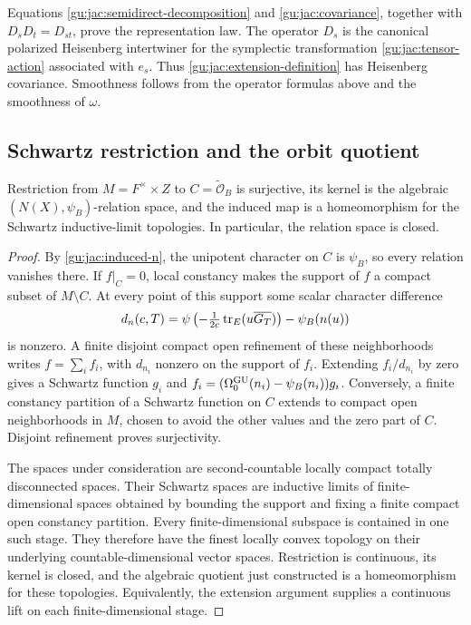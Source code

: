 Equations \eqref{gu:jac:semidirect-decomposition} and \eqref{gu:jac:covariance},
together with $D_sD_t=D_{st}$, prove the representation law.
The operator $D_s$ is the canonical polarized Heisenberg intertwiner for
the symplectic transformation \eqref{gu:jac:tensor-action} associated with
$e_s$.  Thus \eqref{gu:jac:extension-definition} has Heisenberg
covariance.  Smoothness follows from the operator formulas above and the
smoothness of $\omega$.

\subsection{Schwartz restriction and the orbit quotient}\label{gu:app:topology}
\begin{lemma}\label{gu:jac:restriction}
Restriction from $M=F^\times\times Z$ to $C=\widetilde{\mathcal O}_B$
is surjective, its kernel is the algebraic $(N(X),\psi_B)$-relation
space, and the induced map is a homeomorphism for the Schwartz
inductive-limit topologies. In particular, the relation space is closed.
\end{lemma}
\begin{proof}
By \eqref{gu:jac:induced-n}, the unipotent character on $C$ is
$\psi_B$, so every relation vanishes there. If $f|_C=0$, local constancy makes the support
of $f$ a compact subset of $M\setminus C$. At every point of this support
some scalar character difference
\[
 d_n(c,T)=\psi\left(-\tfrac1{2c}\operatorname{tr}_E(u\overline{G_T})\right)
                  -\psi_B(n(u))
\]
is nonzero. A finite disjoint compact open refinement of these
neighborhoods writes $f=\sum_i f_i$, with $d_{n_i}$ nonzero on the
support of $f_i$. Extending $f_i/d_{n_i}$ by zero gives a Schwartz
function $g_i$ and
$f_i=(\Omega_0^{\operatorname{GU}}(n_i)-\psi_B(n_i))g_i$.
Conversely, a finite constancy partition of a Schwartz function on $C$
extends to compact open neighborhoods in $M$, chosen to avoid the other
values and the zero part of $C$. Disjoint refinement proves surjectivity.

The spaces under consideration are second-countable locally compact
totally disconnected spaces.  Their Schwartz spaces are inductive limits
of finite-dimensional spaces obtained by bounding the support and fixing
a finite compact open constancy partition.  Every finite-dimensional
subspace is contained in one such stage.  They therefore have the finest
locally convex topology on their underlying countable-dimensional vector
spaces.  Restriction is continuous, its kernel is closed, and the
algebraic quotient just constructed is a homeomorphism for these
topologies.  Equivalently, the extension argument supplies a continuous
lift on each finite-dimensional stage.
\end{proof}

